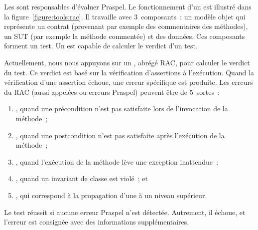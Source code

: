 Les  sont responsables d'évaluer Praspel. Le
fonctionnement d'un  est illustré dans la
figure~\ref{figure:tools:rac}. Il travaille avec 3~composants~: un modèle objet
 qui représente un contrat (provenant par exemple des commentaires
des méthodes), un SUT  (par exemple la méthode commentée) et des
données. Ces composants forment un test. Un  est
capable de calculer le verdict d'un test.

Actuellement, nous nous appuyons sur un ,
abrégé RAC, pour calculer le verdict du test. Ce verdict est basé sur la
vérification d'assertions à l'exécution. Quand la vérification d'une assertion
échoue, une erreur spécifique est produite. Les erreurs du RAC (aussi appelées
 ou erreurs Praspel) peuvent être de 5~sortes~:
%
\begin{enumerate}

\item {}, quand une précondition n'est pas
satisfaite lors de l'invocation de la méthode~;

\item {}, quand une postcondition n'est pas
satisfaite après l'exécution de la méthode~;

\item {}, quand l'exécution de la méthode lève une
exception inattendue~;

\item {}, quand un invariant de classe est violé~; et

\item {}, qui correspond à la propagation
d'une  à un niveau supérieur.

\end{enumerate}
%
Le test réussit si aucune erreur Praspel n'est détectée. Autrement, il échoue,
et l'erreur est consignée avec des informations supplémentaires.


